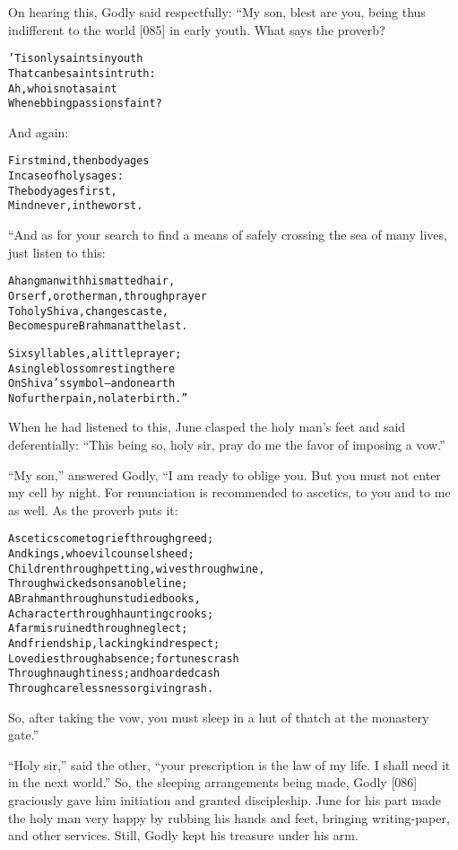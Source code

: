 \documentclass{article}
\renewenvironment{verbatim}{\begin{alltt}\normalfont\begin{centering}}{\end{centering}\end{alltt}}
\begin{document}
On hearing this, Godly said respectfully: “My son, blest are you,
being thus indifferent to the world [085] in early youth. What says
the proverb?

\begin{verbatim}
'Tis only saints in youth
That can be saints in truth:
Ah, who is not a saint
When ebbing passions faint?
\end{verbatim}
And again:

\begin{verbatim}
First mind, then body ages
In case of holy sages:
The body ages first,
Mind never, in the worst.
\end{verbatim}
“And as for your search to find a means of safely crossing the sea
of many lives, just listen to this:

\begin{verbatim}
A hangman with his matted hair,
Or serf, or other man, through prayer
To holy Shiva, changes caste,
Becomes pure Brahman at the last.

Six syllables, a little prayer;
A single blossom resting there
On Shiva's symbol--and on earth
No further pain, no later birth.”
\end{verbatim}
When he had listened to this, June clasped the holy man's feet and
said deferentially:
``This being so, holy sir, pray do me the favor of imposing a vow.''

``My son,'' answered Godly, “I am ready to oblige you. But you must
not enter my cell by night. For renunciation is recommended to
ascetics, to you and to me as well. As the proverb puts it:

\begin{verbatim}
Ascetics come to grief through greed;
And kings, who evil counsels heed;
Children through petting, wives through wine,
Through wicked sons a noble line;
A Brahman through unstudied books,
A character through haunting crooks;
A farm is ruined through neglect;
And friendship, lacking kind respect;
Love dies through absence; fortunes crash
Through naughtiness; and hoarded cash
Through carelessness or giving rash.
\end{verbatim}
So, after taking the vow, you must sleep in a hut of thatch at the
monastery gate.”

``Holy sir,'' said the other,
``your prescription is the law of my life. I shall need it in the next world.''
So, the sleeping arrangements being made, Godly [086] graciously
gave him initiation and granted discipleship. June for his part
made the holy man very happy by rubbing his hands and feet,
bringing writing-paper, and other services. Still, Godly kept his
treasure under his arm.
\end{document}

